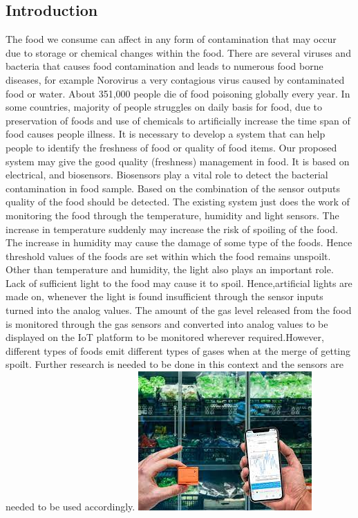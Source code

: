 \documentclass{report}
\begin{document}
\begin{multicols}{1}    
    \section*{Introduction}
    The food we consume can affect in any form of contamination that may occur due to storage or chemical changes within the food. There are several viruses and bacteria that causes food contamination and leads to numerous food borne diseases, for example Norovirus a very contagious virus caused by contaminated food or water. About 351,000 people die of food poisoning globally every year. 
    In some countries, majority of people struggles on daily basis for food, due to preservation of foods and use of chemicals to artificially increase the time span of food causes people illness. It is necessary to develop a system that can help people to identify the freshness of food or quality of food items. Our proposed system may give the good quality (freshness) management in food. It is based on electrical, and biosensors. Biosensors play a vital role to detect the bacterial contamination in food sample. Based on the combination of the sensor outputs quality of the food should be detected.
    The existing system just does the work of monitoring the food through the temperature, humidity and light sensors. The increase in temperature suddenly may increase the risk of spoiling of the food. The increase in humidity may cause the damage of some type of the foods. Hence threshold values of the foods are set within which the food remains unspoilt. Other than temperature and humidity, the light also plays an important role. Lack of sufficient light to the food may cause it to spoil. Hence,artificial lights are made on, whenever the light is found insufficient through the sensor inputs turned into the analog values.
    The amount of the gas level released from the food is monitored through the gas sensors and converted into analog values to be displayed on the IoT platform to be monitored wherever required.However, different types of foods emit different types of gases when at the merge of getting spoilt. Further research is needed to be done in this context and the sensors are needed to be used accordingly.
   \includegraphics{images/monitor.jpeg}
    


\end{multicols}
\end{document}
